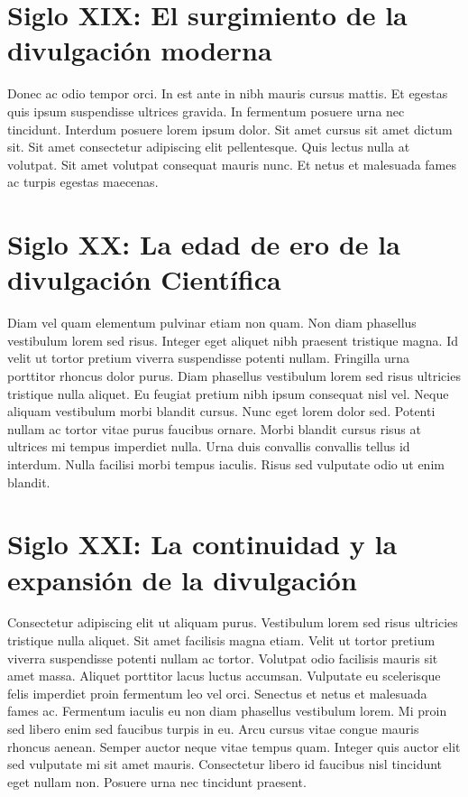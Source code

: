 \section{Siglo XIX: El surgimiento de la divulgación moderna}
Donec ac odio tempor orci. In est ante in nibh mauris cursus mattis. Et egestas quis ipsum suspendisse ultrices gravida. In fermentum posuere urna nec tincidunt. Interdum posuere lorem ipsum dolor. Sit amet cursus sit amet dictum sit. Sit amet consectetur adipiscing elit pellentesque. Quis lectus nulla at volutpat. Sit amet volutpat consequat mauris nunc. Et netus et malesuada fames ac turpis egestas maecenas.

\section{Siglo XX: La edad de ero de la divulgación Científica}
Diam vel quam elementum pulvinar etiam non quam. Non diam phasellus vestibulum lorem sed risus. Integer eget aliquet nibh praesent tristique magna. Id velit ut tortor pretium viverra suspendisse potenti nullam. Fringilla urna porttitor rhoncus dolor purus. Diam phasellus vestibulum lorem sed risus ultricies tristique nulla aliquet. Eu feugiat pretium nibh ipsum consequat nisl vel. Neque aliquam vestibulum morbi blandit cursus. Nunc eget lorem dolor sed. Potenti nullam ac tortor vitae purus faucibus ornare. Morbi blandit cursus risus at ultrices mi tempus imperdiet nulla. Urna duis convallis convallis tellus id interdum. Nulla facilisi morbi tempus iaculis. Risus sed vulputate odio ut enim blandit.

\section{Siglo XXI: La continuidad y la expansión de la divulgación}

Consectetur adipiscing elit ut aliquam purus. Vestibulum lorem sed risus ultricies tristique nulla aliquet. Sit amet facilisis magna etiam. Velit ut tortor pretium viverra suspendisse potenti nullam ac tortor. Volutpat odio facilisis mauris sit amet massa. Aliquet porttitor lacus luctus accumsan. Vulputate eu scelerisque felis imperdiet proin fermentum leo vel orci. Senectus et netus et malesuada fames ac. Fermentum iaculis eu non diam phasellus vestibulum lorem. Mi proin sed libero enim sed faucibus turpis in eu. Arcu cursus vitae congue mauris rhoncus aenean. Semper auctor neque vitae tempus quam. Integer quis auctor elit sed vulputate mi sit amet mauris. Consectetur libero id faucibus nisl tincidunt eget nullam non. Posuere urna nec tincidunt praesent.

